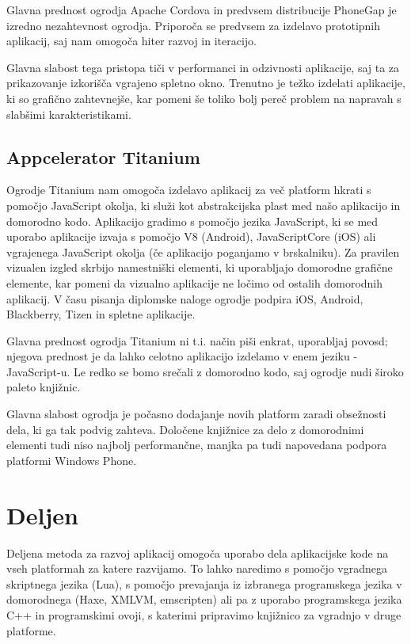 Glavna prednost ogrodja Apache Cordova in predvsem distribucije PhoneGap je izredno nezahtevnost ogrodja. Priporoča se predvsem za izdelavo prototipnih aplikacij, saj nam omogoča hiter razvoj in iteracijo.

Glavna slabost tega pristopa tiči v performanci in odzivnosti aplikacije, saj ta za prikazovanje izkorišča vgrajeno spletno okno. Trenutno je težko izdelati aplikacije, ki so grafično zahtevnejše, kar pomeni še toliko bolj pereč problem na napravah s slabšimi karakteristikami.

\subsection{Appcelerator Titanium}

Ogrodje Titanium nam omogoča izdelavo aplikacij za več platform hkrati s pomočjo JavaScript okolja, ki služi kot abstrakcijska plast med našo aplikacijo in domorodno kodo. Aplikacijo gradimo s pomočjo jezika JavaScript, ki se med uporabo aplikacije izvaja s pomočjo V8 (Android), JavaScriptCore (iOS) ali vgrajenega JavaScript okolja (če aplikacijo poganjamo v brskalniku). Za pravilen vizualen izgled skrbijo namestniški elementi, ki uporabljajo domorodne grafične elemente, kar pomeni da vizualno aplikacije ne ločimo od ostalih domorodnih aplikacij. V času pisanja diplomske naloge ogrodje podpira iOS, Android, Blackberry, Tizen in spletne aplikacije.

Glavna prednost ogrodja Titanium ni t.i. način piši enkrat, uporabljaj povosd; njegova prednost je da lahko celotno aplikacijo izdelamo v enem jeziku - JavaScript-u. Le redko se bomo srečali z domorodno kodo, saj ogrodje nudi široko paleto knjižnic.

Glavna slabost ogrodja je počasno dodajanje novih platform zaradi obsežnosti dela, ki ga tak podvig zahteva. Določene knjižnice za delo z domorodnimi elementi tudi niso najbolj performančne, manjka pa tudi napovedana podpora platformi Windows Phone.

\section{Deljen}

Deljena metoda za razvoj aplikacij omogoča uporabo dela aplikacijske kode na vseh platformah za katere razvijamo. To lahko naredimo s pomočjo vgradnega skriptnega jezika (Lua), s pomočjo prevajanja iz izbranega programskega jezika v domorodnega (Haxe, XMLVM, emscripten) ali pa z uporabo programskega jezika C++ in programskimi ovoji, s katerimi pripravimo knjižnico za vgradnjo v druge platforme.

